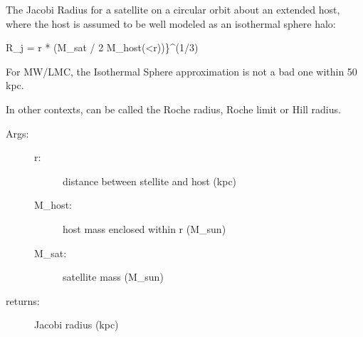 \documentclass[letterpaper,10pt,english]{sphinxmanual}
\begin{document}

\begin{fulllineitems}
\label{\detokenize{utilities:galaxy.utilities.jacobi_radius}}
The Jacobi Radius for a satellite on a circular orbit about an extended host, 
where the host is assumed to be well modeled as an isothermal sphere halo:

R\_j = r * (M\_sat / 2 M\_host(\textless{}r))\}\textasciicircum{}(1/3)

For MW/LMC, the Isothermal Sphere approximation is not a bad one within 50 kpc.

In other contexts, can be called the Roche radius, Roche limit or Hill radius.
\begin{description}
\item[{Args:}] \leavevmode\begin{description}
\item[{r: }] \leavevmode
distance between stellite and host (kpc)

\item[{M\_host: }] \leavevmode
host mass enclosed within r (M\_sun)

\item[{M\_sat: }] \leavevmode
satellite mass (M\_sun)

\end{description}

\item[{returns: }] \leavevmode
Jacobi radius (kpc)

\end{description}

\end{fulllineitems}

\end{document}
